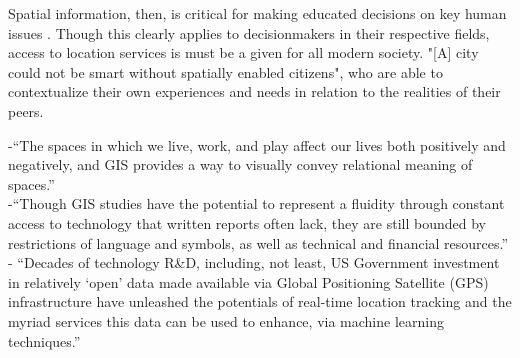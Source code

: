 Spatial information, then, is critical for making educated decisions on key human issues \cite{Rajabifard2009}.%
Though this clearly applies to decisionmakers in their respective fields, access to location services is must be a given for all modern society\cite{Rajabifard2009}. %
 "[A] city could not be smart without spatially enabled citizens"\cite{Roch2012}, %
who are able to contextualize their own experiences and needs in relation to the realities of their peers.

















-{\color{orange}“The spaces in which we live, work, and play affect our lives both positively and negatively, and GIS provides a way to visually convey relational meaning of spaces.'' \cite{McQueenBaker2019}}\\

-{\color{orange}“Though GIS studies have the potential to represent a fluidity through constant access to technology that written reports often lack, they are still bounded by restrictions of language and symbols, as well as technical and financial resources.”\cite{McQueenBaker2019}}\\
-{\color{orange} “Decades of technology R\&D, including, not least, US Government investment in relatively ‘open’ data made available via Global Positioning Satellite (GPS) infrastructure have unleashed the potentials of real-time location tracking and the myriad services this data can be used to enhance, via machine learning techniques.”\cite{Barns2020}}\\


